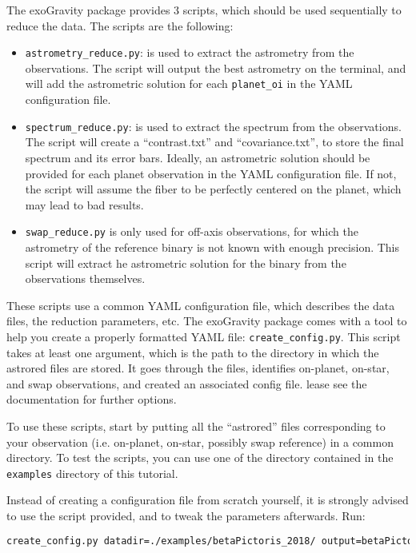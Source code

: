 The exoGravity package provides 3 scripts, which should be used sequentially to reduce the data. The scripts are the following:
\begin{itemize}
\item{\verb|astrometry_reduce.py|: is used to extract the astrometry from the observations. The script will output the best astrometry on the terminal, and will add the astrometric solution for each \verb|planet_oi| in the YAML configuration file.} 
\item{\verb|spectrum_reduce.py|: is used to extract the spectrum from the observations. The script will create a ``contrast.txt'' and ``covariance.txt'', to store the final spectrum and its error bars. Ideally, an astrometric solution should be provided for each planet observation in the YAML configuration file. If not, the script will assume the fiber to be perfectly centered on the planet, which may lead to bad results.}
\item{\verb|swap_reduce.py| is only used for off-axis observations, for which the astrometry of the reference binary is not known with enough precision. This script will extract he astrometric solution for the binary from the observations themselves.}
\end{itemize}

These scripts use a common YAML configuration file, which describes the data files, the reduction parameters, etc. The exoGravity package comes with a tool to help you create a properly formatted YAML file: \verb|create_config.py|. This script takes at least one argument, which is the path to the directory in which the astrored files are stored. It goes through the files, identifies on-planet, on-star, and swap observations, and created an associated config file. lease see the documentation for further options.

To use these scripts, start by putting all the ``astrored'' files corresponding to your observation (i.e. on-planet, on-star, possibly swap reference) in a common directory. To test the scripts, you can use one of the directory contained in the \verb|examples| directory of this tutorial.

Instead of creating a configuration file from scratch yourself, it is strongly advised to use the script provided, and to tweak the parameters afterwards. Run:
\begin{lstlisting}[language=bash]
create_config.py datadir=./examples/betaPictoris_2018/ output=betaPictoris2018.yml
\end{lstlisting}

